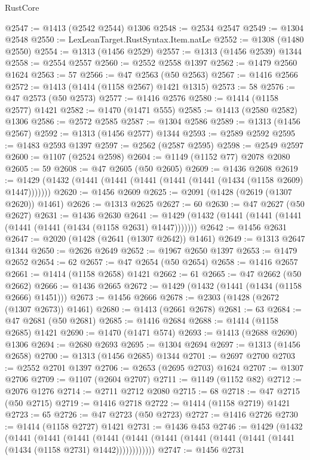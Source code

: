 \begin{lexlean}{RustCore}
\begin{coremodule}
@2547 := @1413 (@2542 @2544) @1306
@2548 := @2534 @2547
@2549 := @1304 @2548
@2550 := LexLeanTarget.RustSyntax.Item.natLe
@2552 := @1308 (@1480 @2550)
@2554 := @1313 (@1456 @2529)
@2557 := @1313 (@1456 @2539) @1344
@2558 := @2554 @2557
@2560 := @2552 @2558 @1397
@2562 := @1479 @2560 @1624
@2563 := 57
@2566 := @47 @2563 (@50 @2563)
@2567 := @1416 @2566
@2572 := @1413 (@1414 (@1158 @2567) @1421 @1315)
@2573 := 58
@2576 := @47 @2573 (@50 @2573)
@2577 := @1416 @2576
@2580 := @1414 (@1158 @2577) @1421
@2582 := @1470 (@1471 @555)
@2585 := @1413 (@2580 @2582) @1306
@2586 := @2572 @2585
@2587 := @1304 @2586
@2589 := @1313 (@1456 @2567)
@2592 := @1313 (@1456 @2577) @1344
@2593 := @2589 @2592
@2595 := @1483 @2593 @1397
@2597 := @2562 (@2587 @2595)
@2598 := @2549 @2597
@2600 := @1107 (@2524 @2598)
@2604 := @1149 (@1152 @77) @2078 @2080
@2605 := 59
@2608 := @47 @2605 (@50 @2605)
@2609 := @1436 @2608
@2619 := @1429 (@1432 (@1441 (@1441 (@1441 (@1441 (@1441 (@1434 (@1158 @2609) @1447)))))))
@2620 := @1456 @2609
@2625 := @2091 (@1428 (@2619 (@1307 @2620)) @1461)
@2626 := @1313 @2625
@2627 := 60
@2630 := @47 @2627 (@50 @2627)
@2631 := @1436 @2630
@2641 := @1429 (@1432 (@1441 (@1441 (@1441 (@1441 (@1441 (@1434 (@1158 @2631) @1447)))))))
@2642 := @1456 @2631
@2647 := @2020 (@1428 (@2641 (@1307 @2642)) @1461)
@2649 := @1313 @2647 @1344
@2650 := @2626 @2649
@2652 := @1967 @2650 @1397
@2653 := @1479 @2652
@2654 := 62
@2657 := @47 @2654 (@50 @2654)
@2658 := @1416 @2657
@2661 := @1414 (@1158 @2658) @1421
@2662 := 61
@2665 := @47 @2662 (@50 @2662)
@2666 := @1436 @2665
@2672 := @1429 (@1432 (@1441 (@1434 (@1158 @2666) @1451)))
@2673 := @1456 @2666
@2678 := @2303 (@1428 (@2672 (@1307 @2673)) @1461)
@2680 := @1413 (@2661 @2678)
@2681 := 63
@2684 := @47 @2681 (@50 @2681)
@2685 := @1416 @2684
@2688 := @1414 (@1158 @2685) @1421
@2690 := @1470 (@1471 @574)
@2693 := @1413 (@2688 @2690) @1306
@2694 := @2680 @2693
@2695 := @1304 @2694
@2697 := @1313 (@1456 @2658)
@2700 := @1313 (@1456 @2685) @1344
@2701 := @2697 @2700
@2703 := @2552 @2701 @1397
@2706 := @2653 (@2695 @2703) @1624
@2707 := @1307 @2706
@2709 := @1107 (@2604 @2707)
@2711 := @1149 (@1152 @82)
@2712 := @2076 @1276
@2714 := @2711 @2712 @2080
@2715 := 68
@2718 := @47 @2715 (@50 @2715)
@2719 := @1416 @2718
@2722 := @1414 (@1158 @2719) @1421
@2723 := 65
@2726 := @47 @2723 (@50 @2723)
@2727 := @1416 @2726
@2730 := @1414 (@1158 @2727) @1421
@2731 := @1436 @453
@2746 := @1429
    (@1432
      (@1441
        (@1441
          (@1441
            (@1441 (@1441 (@1441 (@1441 (@1441 (@1441 (@1441 (@1434 (@1158 @2731) @1442))))))))))))
@2747 := @1456 @2731

\end{coremodule}
\end{lexlean}
